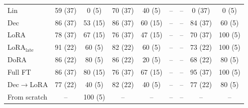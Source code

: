 \begin{tabular}{@{}lcccccccc@{}}
Lin & 59 (37) & 0 (5) & 70 (37) & 40 (5) & -- & -- & 0 (37) & 0 (5) \\
Dec & 86 (37) & 53 (15) & 86 (37) & 60 (15) & -- & -- & 84 (37) & 60 (5) \\
LoRA & 78 (37) & 67 (15) & 76 (37) & 47 (15) & -- & -- & 70 (37) & 100 (5) \\
LoRA$_{\text{late}}$ & 91 (22) & 60 (5) & 82 (22) & 60 (5) & -- & -- & 73 (22) & 100 (5) \\
DoRA & 86 (22) & 80 (5) & 86 (22) & 20 (5) & -- & -- & 68 (22) & 80 (5) \\
Full FT & 86 (37) & 80 (15) & 76 (37) & 67 (15) & -- & -- & 95 (37) & 100 (5) \\
Dec$\to$LoRA & 77 (22) & 40 (5) & 82 (22) & 40 (5) & -- & -- & 77 (22) & 80 (5) \\
From scratch & -- & 100 (5) & -- & -- & -- & -- & -- & -- \\
\bottomrule
\end{tabular}
